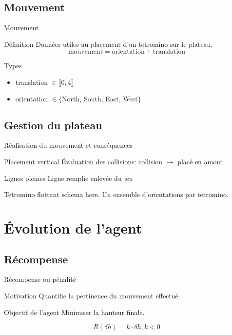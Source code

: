 \documentclass[tikz, footheight=2em]{beamer}
\begin{document}
\subsection{Mouvement}
\begin{frame}[c]{Mouvement}
  \begin{block}{Définition}
    Données utiles au placement d'un tetromino sur le plateau.
    \pause{}
    \[ \text{mouvement} = \text{orientation} + \text{translation} \]
  \end{block}
  \pause{}
  \begin{block}{Types}
    \begin{itemize}
      \item translation \(\in \llbracket 0, 4 \rrbracket\)
      \item orientation \(\in \{\)North, South, East, West\(\}\)
    \end{itemize}
  \end{block}
\end{frame}

\subsection{Gestion du plateau}
\begin{frame}[c]{Réalisation du mouvement et conséquences}
  \begin{block}{Placement vertical}
    Évaluation des collisions: collision \(\rightarrow\) placé en amont
  \end{block}
  \begin{block}{Lignes pleines}
    Ligne remplie enlevée du jeu
  \end{block}
  \begin{alertblock}{Tetromino flottant}
    schema here. Un ensemble d'orientations par tetromino.
  \end{alertblock}
\end{frame}

\section{Évolution de l'agent}
\subsection{Récompense}
\begin{frame}[c]{Récompense ou pénalité}
  \begin{block}{Motivation}
    Quantifie la pertinence du mouvement effectué.
  \end{block}
  \pause{}
  \begin{block}{Objectif de l'agent}
    Minimiser la hauteur finale.
  \end{block}
  \pause{}
  \[ R(\delta h) = k \cdot \delta h, k < 0 \]
\end{frame}
\end{document}
